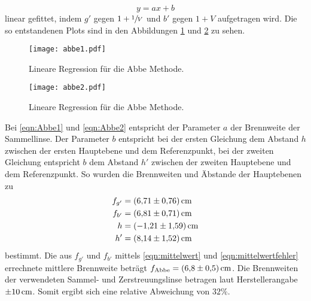 \begin{equation*}
  y=ax+b
\end{equation*}
linear gefittet, indem $g'$ gegen $1+\sfrac{1}{V}$ und $b'$ gegen $1+V$ aufgetragen wird.
Die so entstandenen Plots sind in den Abbildungen \ref{fig:abbe1} und \ref{fig:abbe2} zu sehen.
\begin{figure}
  \centering
  \texttt{[image: abbe1.pdf]}
  \caption{Lineare Regression für die Abbe Methode.}
  \label{fig:abbe1}
\end{figure}
\begin{figure}
  \centering
  \texttt{[image: abbe2.pdf]}
  \caption{Lineare Regression für die Abbe Methode.}
  \label{fig:abbe2}
\end{figure}
Bei \eqref{eqn:Abbe1} und \eqref{eqn:Abbe2} entspricht der Parameter $a$ der Brennweite der Sammellinse. Der Parameter $b$ entspricht bei der ersten Gleichung dem Abstand
$h$ zwischen der ersten Hauptebene und dem Referenzpunkt, bei der zweiten Gleichung entspricht $b$ dem Abstand $h'$ zwischen der zweiten Hauptebene und dem
Referenzpunkt. So wurden die Brennweiten und Äbstande der Hauptebenen zu
\begin{align*}
  f_{g'} &= \SI{6.71\pm0.76}{\centi\metre} \\
  f_{b'} &= \SI{6.81\pm0.71}{\centi\metre} \\
  h &= \SI{-1.21\pm1.59}{\centi\metre} \\
  h' &= \SI{8.14\pm1.52}{\centi\metre}
\end{align*}
bestimmt.
Die aus $f_{g'}$ und $f_{b'}$ mittels \eqref{eqn:mittelwert} und \eqref{eqn:mittelwertfehler} errechnete mittlere Brennweite beträgt $f_\text{Abbe}=\SI{6.8\pm0.5}{\centi\metre}$.
Die Brennweiten der verwendeten Sammel- und Zerstreuungslinse betragen laut Herstellerangabe $\SI{\pm10}{\centi\metre}$. Somit ergibt sich eine
relative Abweichung von $32 \%$.
